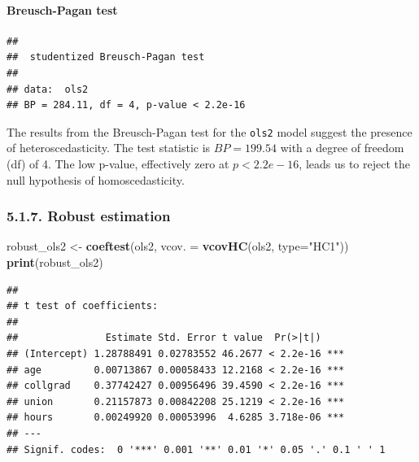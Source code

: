 \documentclass[
]{article}
\newenvironment{Shaded}{\begin{snugshade}}{\end{snugshade}}
\newcommand{\AttributeTok}[1]{\textcolor[rgb]{0.13,0.29,0.53}{#1}}
\newcommand{\FunctionTok}[1]{\textcolor[rgb]{0.13,0.29,0.53}{\textbf{#1}}}
\newcommand{\NormalTok}[1]{#1}
\newcommand{\OtherTok}[1]{\textcolor[rgb]{0.56,0.35,0.01}{#1}}
\newcommand{\StringTok}[1]{\textcolor[rgb]{0.31,0.60,0.02}{#1}}
\begin{document}
\paragraph{Breusch-Pagan test}\label{breusch-pagan-test}

\begin{verbatim}
## 
##  studentized Breusch-Pagan test
## 
## data:  ols2
## BP = 284.11, df = 4, p-value < 2.2e-16
\end{verbatim}

The results from the Breusch-Pagan test for the \texttt{ols2} model
suggest the presence of heteroscedasticity. The test statistic is
\(BP = 199.54\) with a degree of freedom (df) of 4. The low p-value,
effectively zero at \(p < 2.2e-16\), leads us to reject the null
hypothesis of homoscedasticity.

\subsubsection{5.1.7. Robust estimation}\label{robust-estimation}

\begin{Shaded}
\begin{Highlighting}[]
\NormalTok{robust\_ols2 }\OtherTok{\textless{}{-}} \FunctionTok{coeftest}\NormalTok{(ols2, }\AttributeTok{vcov. =} \FunctionTok{vcovHC}\NormalTok{(ols2, }\AttributeTok{type=}\StringTok{"HC1"}\NormalTok{))}
\FunctionTok{print}\NormalTok{(robust\_ols2)}
\end{Highlighting}
\end{Shaded}

\begin{verbatim}
## 
## t test of coefficients:
## 
##               Estimate Std. Error t value  Pr(>|t|)    
## (Intercept) 1.28788491 0.02783552 46.2677 < 2.2e-16 ***
## age         0.00713867 0.00058433 12.2168 < 2.2e-16 ***
## collgrad    0.37742427 0.00956496 39.4590 < 2.2e-16 ***
## union       0.21157873 0.00842208 25.1219 < 2.2e-16 ***
## hours       0.00249920 0.00053996  4.6285 3.718e-06 ***
## ---
## Signif. codes:  0 '***' 0.001 '**' 0.01 '*' 0.05 '.' 0.1 ' ' 1
\end{verbatim}
\end{document}
